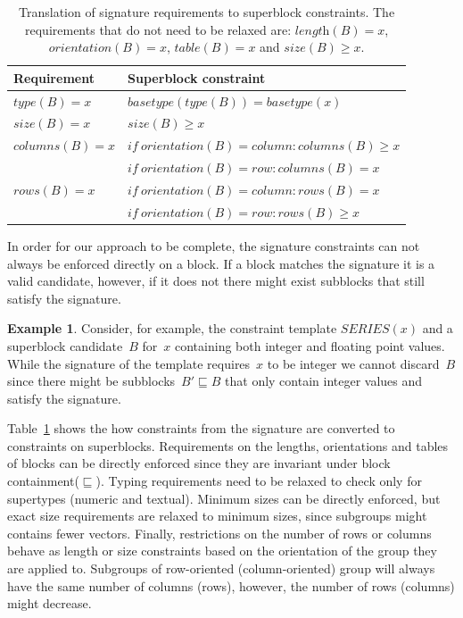 \documentclass{IEEEtran}
\newcommand{\format}[1]{\textit{#1}\xspace}
\newcommand{\ecseries}[1]{\ensuremath{\textit{SERIES}(#1)}}
\newcommand{\plength}{\format{length}}
\newcommand{\psize}{\format{size}}
\newcommand{\ptype}{\format{type}}
\newcommand{\ptable}{\format{table}}
\newcommand{\por}{\format{orientation}}
\newcommand{\prows}{\format{rows}}
\newcommand{\pcols}{\format{columns}}
\theoremstyle{definition}
\newtheorem{example}{Example}
\begin{document}
\begin{table}[htb]
  \caption{Translation of signature requirements to superblock constraints. The requirements that do not need to be relaxed are: $\plength(B) = x$, $\por(B) = x$, $\ptable(B) = x$ and $\psize(B) \geq x$.}
  \label{tbl:translation}
  \begin{tabularx}{\linewidth}{lX}
    \textbf{Requirement} & \textbf{Superblock constraint} \\ \hline \hline
    $\ptype(B) = x$ & $\mathit{basetype}(\ptype(B)) = \mathit{basetype}(x)$ \\ \hline
    $\psize(B) = x$ & $\psize(B) \geq x$ \\ \hline
    $\pcols(B) = x$ & $\mathit{if}~\por(B) = \mathit{column}: \pcols(B) \geq x$ \\ 
    & $\mathit{if}~\por(B) = \mathit{row}: \pcols(B) = x$ \\ \hline
    $\prows(B) = x$ & $\mathit{if}~\por(B) = \mathit{column}: \prows(B) = x$ \\ 
    & $\mathit{if}~\por(B) = \mathit{row}: \prows(B) \geq x$
  \end{tabularx}
\end{table}

In order for our approach to be complete, the signature constraints can not always be enforced directly on a block.
If a block matches the signature it is a valid candidate, however, if it does not there might exist subblocks that still satisfy the signature.
\begin{example}
  Consider, for example, the constraint template \ecseries{x} and a superblock candidate~$B$ for~$x$ containing both integer and floating point values.
  While the signature of the template requires~$x$ to be integer we cannot discard~$B$ since there might be subblocks~$B' \sqsubseteq B$ that only contain integer values and satisfy the signature.
\end{example}
Table~\ref{tbl:translation} shows the how constraints from the signature are converted to constraints on superblocks.
Requirements on the lengths, orientations and tables of blocks can be directly enforced since they are invariant under block containment($\sqsubseteq$).
Typing requirements need to be relaxed to check only for supertypes (numeric and textual).
Minimum sizes can be directly enforced, but exact size requirements are relaxed to minimum sizes, since subgroups might contains fewer vectors.
Finally, restrictions on the number of rows or columns behave as length or size constraints based on the orientation of the group they are applied to.
Subgroups of row-oriented (column-oriented) group will always have the same number of columns (rows), however, the number of rows (columns) might decrease.
\end{document}
